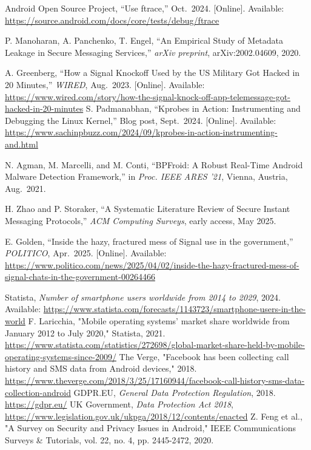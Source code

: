\documentclass[a4paper,12pt]{report}
\begin{document}
\begin{thebibliography}{99}
Android Open Source Project, “Use ftrace,” Oct.\ 2024.  [Online]. Available: \url{https://source.android.com/docs/core/tests/debug/ftrace}

P. Manoharan, A. Panchenko, T. Engel,
``An Empirical Study of Metadata Leakage in Secure Messaging Services,''
\emph{arXiv preprint}, arXiv:2002.04609, 2020.

A. Greenberg,
``How a Signal Knockoff Used by the US Military Got Hacked in 20 Minutes,''
\emph{WIRED}, Aug.\ 2023.
[Online]. Available: \url{https://www.wired.com/story/how-the-signal-knock-off-app-telemessage-got-hacked-in-20-minutes}
S. Padmanabhan, “Kprobes in Action: Instrumenting and Debugging the Linux Kernel,” Blog post, Sept.\ 2024.  [Online]. Available: \url{https://www.sachinpbuzz.com/2024/09/kprobes-in-action-instrumenting-and.html}

N. Agman, M. Marcelli, and M. Conti, “BPFroid: A Robust Real-Time Android Malware Detection Framework,” in \emph{Proc. IEEE ARES ’21}, Vienna, Austria, Aug.\ 2021.

H. Zhao and P. Storaker, “A Systematic Literature Review of Secure Instant Messaging Protocols,” \emph{ACM Computing Surveys}, early access, May 2025.

E. Golden, “Inside the hazy, fractured mess of Signal use in the government,” \emph{POLITICO}, Apr.\ 2025.  [Online]. Available: \url{https://www.politico.com/news/2025/04/02/inside-the-hazy-fractured-mess-of-signal-chats-in-the-government-00264466}

     Statista, \textit{Number of smartphone users worldwide from 2014 to 2029}, 2024. Available: \url{https://www.statista.com/forecasts/1143723/smartphone-users-in-the-world}
     F. Laricchia, "Mobile operating systems’ market share worldwide from January 2012 to July 2020," Statista, 2021. \url{https://www.statista.com/statistics/272698/global-market-share-held-by-mobile-operating-systems-since-2009/}
     The Verge, "Facebook has been collecting call history and SMS data from Android devices," 2018. \url{https://www.theverge.com/2018/3/25/17160944/facebook-call-history-sms-data-collection-android}
     GDPR.EU, \textit{General Data Protection Regulation}, 2018. \url{https://gdpr.eu/}
     UK Government, \textit{Data Protection Act 2018}, \url{https://www.legislation.gov.uk/ukpga/2018/12/contents/enacted}
     Z. Feng et al., "A Survey on Security and Privacy Issues in Android," IEEE Communications Surveys \& Tutorials, vol. 22, no. 4, pp. 2445-2472, 2020.


\end{thebibliography}
\end{document}
